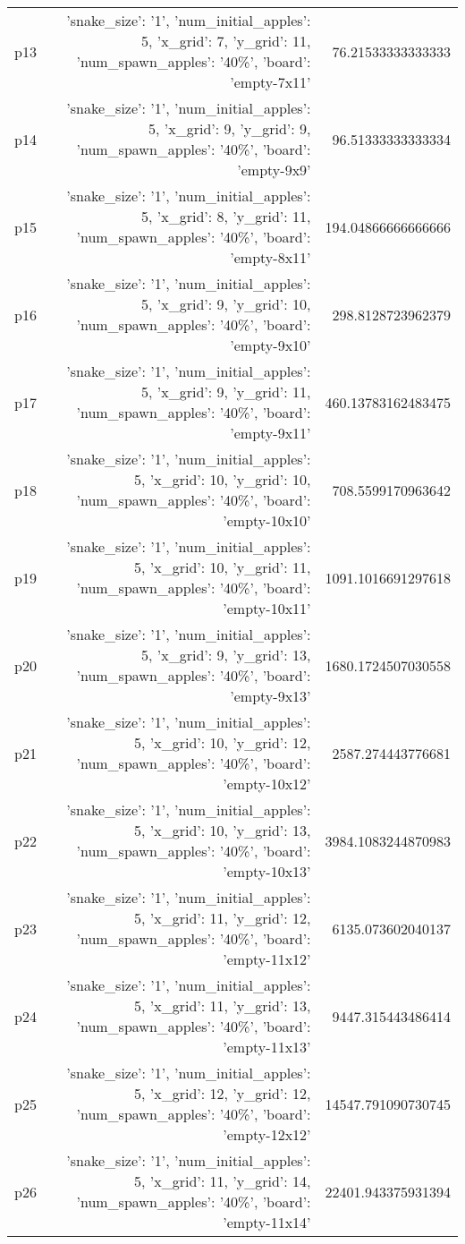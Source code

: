 \documentclass{article}
\begin{document}
\begin{center}
\begin{tabular}{r|r|r}
  p13&{'snake\_size': '1', 'num\_initial\_apples': 5, 'x\_grid': 7, 'y\_grid': 11, 'num\_spawn\_apples': '40\%', 'board': 'empty-7x11'}&76.21533333333333\\
  p14&{'snake\_size': '1', 'num\_initial\_apples': 5, 'x\_grid': 9, 'y\_grid': 9, 'num\_spawn\_apples': '40\%', 'board': 'empty-9x9'}&96.51333333333334\\
  p15&{'snake\_size': '1', 'num\_initial\_apples': 5, 'x\_grid': 8, 'y\_grid': 11, 'num\_spawn\_apples': '40\%', 'board': 'empty-8x11'}&194.04866666666666\\
  p16&{'snake\_size': '1', 'num\_initial\_apples': 5, 'x\_grid': 9, 'y\_grid': 10, 'num\_spawn\_apples': '40\%', 'board': 'empty-9x10'}&298.8128723962379\\
  p17&{'snake\_size': '1', 'num\_initial\_apples': 5, 'x\_grid': 9, 'y\_grid': 11, 'num\_spawn\_apples': '40\%', 'board': 'empty-9x11'}&460.13783162483475\\
  p18&{'snake\_size': '1', 'num\_initial\_apples': 5, 'x\_grid': 10, 'y\_grid': 10, 'num\_spawn\_apples': '40\%', 'board': 'empty-10x10'}&708.5599170963642\\
  p19&{'snake\_size': '1', 'num\_initial\_apples': 5, 'x\_grid': 10, 'y\_grid': 11, 'num\_spawn\_apples': '40\%', 'board': 'empty-10x11'}&1091.1016691297618\\
  p20&{'snake\_size': '1', 'num\_initial\_apples': 5, 'x\_grid': 9, 'y\_grid': 13, 'num\_spawn\_apples': '40\%', 'board': 'empty-9x13'}&1680.1724507030558\\
  p21&{'snake\_size': '1', 'num\_initial\_apples': 5, 'x\_grid': 10, 'y\_grid': 12, 'num\_spawn\_apples': '40\%', 'board': 'empty-10x12'}&2587.274443776681\\
  p22&{'snake\_size': '1', 'num\_initial\_apples': 5, 'x\_grid': 10, 'y\_grid': 13, 'num\_spawn\_apples': '40\%', 'board': 'empty-10x13'}&3984.1083244870983\\
  p23&{'snake\_size': '1', 'num\_initial\_apples': 5, 'x\_grid': 11, 'y\_grid': 12, 'num\_spawn\_apples': '40\%', 'board': 'empty-11x12'}&6135.073602040137\\
  p24&{'snake\_size': '1', 'num\_initial\_apples': 5, 'x\_grid': 11, 'y\_grid': 13, 'num\_spawn\_apples': '40\%', 'board': 'empty-11x13'}&9447.315443486414\\
  p25&{'snake\_size': '1', 'num\_initial\_apples': 5, 'x\_grid': 12, 'y\_grid': 12, 'num\_spawn\_apples': '40\%', 'board': 'empty-12x12'}&14547.791090730745\\
  p26&{'snake\_size': '1', 'num\_initial\_apples': 5, 'x\_grid': 11, 'y\_grid': 14, 'num\_spawn\_apples': '40\%', 'board': 'empty-11x14'}&22401.943375931394\\

\end{tabular}
\end{center}
\end{document}
